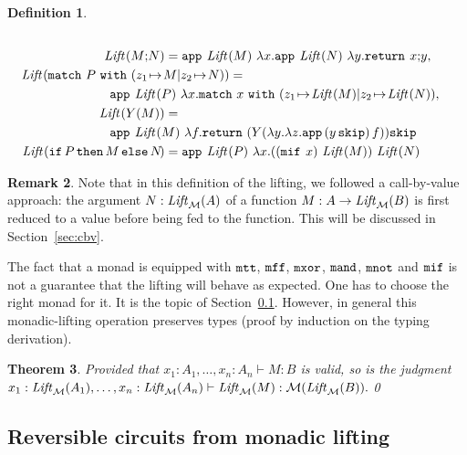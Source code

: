 \documentclass{article}
\theoremstyle{plain}
\newtheorem{theorem}{Theorem}
\theoremstyle{definition}
\newtheorem{definition}[theorem]{Definition}
\newtheorem{remark}[theorem]{Remark}
\newcommand{\punit}{\mathtt{skip}}\newcommand{\prodterm}[1]{{\langle{#1}\rangle}}
\newcommand{\letunitterm}[2]{{#1}\mathtt{;}{#2}}
\newcommand{\iftermx}[3]{{{\mathtt{if}}~{#1}~\mathtt{then}~{#2}~\mathtt{else}~{#3}}}
\newcommand{\match}[5]{{{\mathtt{match}}~{#1}~{\mathtt{with}}~({#2\,\mapsto\,#3}\vert{#4\,\mapsto\,#5})}}
\newcommand{\monadreturn}{{\tt return}}
\newcommand{\monadapp}{{\tt app}}
\newcommand{\Lift}[1]{{\it Lift}_{\mathcal{#1}}}
\newcommand{\monadttrue}{{\tt mtt}}
\newcommand{\monadffalse}{{\tt mff}}
\newcommand{\monadif}{{\tt mif}}
\newcommand{\monadand}{{\tt mand}}
\newcommand{\monadxor}{{\tt mxor}}
\newcommand{\monadnot}{{\tt mnot}}
\begin{document}
\begin{definition}
{\begin{align*}
    \\
    \Lift{}(\letunitterm{M}{N})
    &= 
    \monadapp_{\mathcal{}}~\Lift{}(M)~
    \lambda x.
    \monadapp_{\mathcal{}}~\Lift{}(N)~
    \lambda y.\monadreturn_{\mathcal{}}~\letunitterm{x}{y},
    \\
   \Lift{}(\match{P}{z_1\!\!}{\!\!M}{z_2\!\!}{\!\!N})=\hspace{-15ex}~
    &\\
     &\hspace{-10ex}
    \monadapp_{\mathcal{}}~\Lift{}(P)~
    \lambda x.
    \match{x}{z_1\!\!}{\!\!\Lift{}(M)}{z_2\!\!}{\!\!\Lift{}(N)},
    \\
    \Lift{}(Y(M))
    &=\\&\hspace{-10ex}\monadapp_{\mathcal{}}~\Lift{}(M)~
    \lambda f.
    \monadreturn~(Y(\lambda y.\lambda z.\monadapp\,(y\,\punit)\,f))\punit
    \\
    \Lift{}(\iftermx{\!P\!}{\!M\!}{\!N\!})
    & =
    \monadapp_{\mathcal{}}~\Lift{}(P)~
    \lambda x.
    ((\monadif_{\mathcal{}}~x)~\Lift{}(M))~\Lift{}(N)
  \end{align*}}
\end{definition}

\begin{remark}\label{rem:cbv}
  Note that in this definition of the lifting, we followed a
  call-by-value approach: the argument $N:\Lift{M}(A)$ of a function
  $M:A \to \Lift{M}(B)$ is first reduced to a value before being fed
  to the function. This will be discussed in Section~\ref{sec:cbv}.
\end{remark}

The fact that a monad is equipped with $\monadttrue$, $\monadffalse$,
$\monadxor$, $\monadand$, $\monadnot$ and $\monadif$ is not a
guarantee that the lifting will behave as expected. One has to choose
the right monad for it. It is the topic of
Section~\ref{sec:rev-circ-from-monad}.  However, in general this
monadic-lifting operation preserves types (proof by induction on the
typing derivation).

\begin{theorem}
  Provided that $x_1:A_1,\ldots,x_n:A_n\vdash M:B$ is valid, so is the judgment
  $
  x_1:\Lift{M}(A_1),\ldots,x_n:\Lift{M}(A_n)\vdash
  \Lift{M}(M):\mathcal{M}(\Lift{M}(B)).
  $\qed
\end{theorem}




\subsection{Reversible circuits from monadic lifting}
\label{sec:rev-circ-from-monad}
\end{document}
